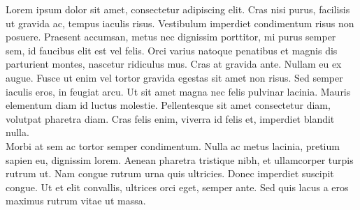 Lorem ipsum dolor sit amet, consectetur adipiscing elit. Cras nisi purus, facilisis ut gravida ac, tempus iaculis risus. Vestibulum imperdiet condimentum risus non posuere. Praesent accumsan, metus nec dignissim porttitor, mi purus semper sem, id faucibus elit est vel felis. Orci varius natoque penatibus et magnis dis parturient montes, nascetur ridiculus mus. Cras at gravida ante. Nullam eu ex augue. Fusce ut enim vel tortor gravida egestas sit amet non risus. Sed semper iaculis eros, in feugiat arcu. Ut sit amet magna nec felis pulvinar lacinia. Mauris elementum diam id luctus molestie. Pellentesque sit amet consectetur diam, volutpat pharetra diam. Cras felis enim, viverra id felis et, imperdiet blandit nulla.
\\
Morbi at sem ac tortor semper condimentum. Nulla ac metus lacinia, pretium sapien eu, dignissim lorem. Aenean pharetra tristique nibh, et ullamcorper turpis rutrum ut. Nam congue rutrum urna quis ultricies. Donec imperdiet suscipit congue. Ut et elit convallis, ultrices orci eget, semper ante. Sed quis lacus a eros maximus rutrum vitae ut massa.
